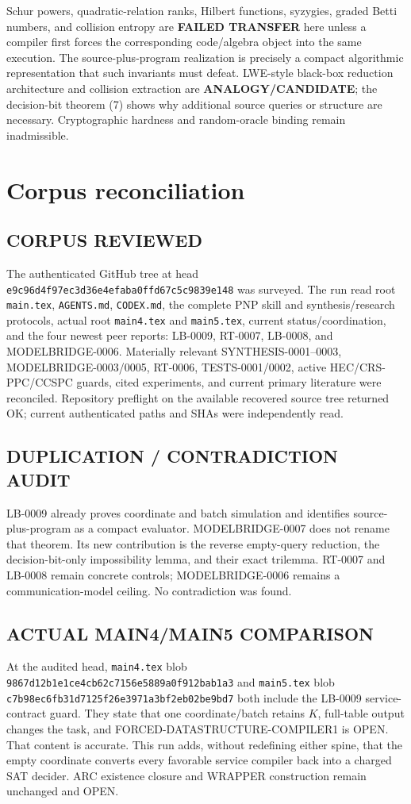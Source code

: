 \documentclass[11pt]{article}
\begin{document}
Schur powers, quadratic-relation ranks, Hilbert functions, syzygies, graded
Betti numbers, and collision entropy are \textbf{FAILED TRANSFER} here unless
a compiler first forces the corresponding code/algebra object into the same
execution.  The source-plus-program realization is precisely a compact
algorithmic representation that such invariants must defeat.  LWE-style
black-box reduction architecture and collision extraction are
\textbf{ANALOGY/CANDIDATE}; the decision-bit theorem (7) shows why additional
source queries or structure are necessary.  Cryptographic hardness and
random-oracle binding remain inadmissible.

\section{Corpus reconciliation}

\subsection*{CORPUS REVIEWED}
The authenticated GitHub tree at head
\texttt{e9c96d4f97ec3d36e4efaba0ffd67c5c9839e148} was surveyed.  The run read
root \texttt{main.tex}, \texttt{AGENTS.md}, \texttt{CODEX.md}, the complete
PNP skill and synthesis/research protocols, actual root \texttt{main4.tex}
and \texttt{main5.tex}, current status/coordination, and the four newest peer
reports: LB-0009, RT-0007, LB-0008, and MODELBRIDGE-0006.  Materially relevant
SYNTHESIS-0001--0003, MODELBRIDGE-0003/0005, RT-0006, TESTS-0001/0002, active
HEC/CRS-PPC/CCSPC guards, cited experiments, and current primary literature
were reconciled.  Repository preflight on the available recovered source tree
returned OK; current authenticated paths and SHAs were independently read.

\subsection*{DUPLICATION / CONTRADICTION AUDIT}
LB-0009 already proves coordinate and batch simulation and identifies
source-plus-program as a compact evaluator.  MODELBRIDGE-0007 does not rename
that theorem.  Its new contribution is the reverse empty-query reduction,
the decision-bit-only impossibility lemma, and their exact trilemma.  RT-0007
and LB-0008 remain concrete controls; MODELBRIDGE-0006 remains a
communication-model ceiling.  No contradiction was found.

\subsection*{ACTUAL MAIN4/MAIN5 COMPARISON}
At the audited head, \texttt{main4.tex} blob
\texttt{9867d12b1e1ce4cb62c7156e5889a0f912bab1a3} and
\texttt{main5.tex} blob
\texttt{c7b98ec6fb31d7125f26e3971a3bf2eb02be9bd7} both include the LB-0009
service-contract guard.  They state that one coordinate/batch retains $K$,
full-table output changes the task, and FORCED-DATASTRUCTURE-COMPILER1 is
OPEN.  That content is accurate.  This run adds, without redefining either
spine, that the empty coordinate converts every favorable service compiler
back into a charged SAT decider.  ARC existence closure and WRAPPER
construction remain unchanged and OPEN.
\end{document}
